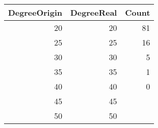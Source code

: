 \begin{tabular}{rrr}
\toprule
 DegreeOrigin &  DegreeReal &  Count \\
\midrule
           20 &          20 &     81 \\
           25 &          25 &     16 \\
           30 &          30 &      5 \\
           35 &          35 &      1 \\
           40 &          40 &      0 \\
           45 &          45 &   \color{red}{1999} \\
           50 &          50 &   \color{red}{4914} \\
\bottomrule
\end{tabular}
